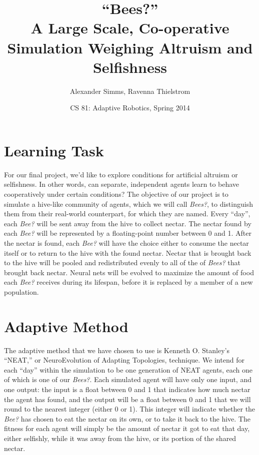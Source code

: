 \documentclass{article}
\title  {``Bees?''\\ A Large Scale, Co-operative Simulation Weighing Altruism and Selfishness}
\author {Alexander Simms, Ravenna Thielstrom}
\date   {CS 81: Adaptive Robotics, Spring 2014}
\begin{document}
\maketitle





\section{Learning Task} %
\label{sec:learning_task}

	For our final project, we'd like to explore conditions for artificial altruism or selfishness. In other words, can separate, independent agents learn to behave cooperatively under certain conditions? The objective of our project is to simulate a hive-like community of agents, which we will call \emph{Bees?}, to distinguish them from their real-world counterpart, for which they are named. Every ``day'', each \emph{Bee?} will be sent away from the hive to collect nectar. The nectar found by each \emph{Bee?} will be represented by a floating-point number between 0 and 1. After the nectar is found, each \emph{Bee?} will have the choice either to consume the nectar itself or to return to the hive with the found nectar. Nectar that is brought back to the hive will be pooled and redistributed evenly to all of the of \emph{Bees?} that brought back nectar. Neural nets will be evolved to maximize the amount of food each \emph{Bee?} receives during its lifespan, before it is replaced by a member of a new population.
		



\section{Adaptive Method} %
\label{sec:adaptive_method}

	The adaptive method that we have chosen to use is Kenneth O. Stanley's ``NEAT,'' or NeuroEvolution of Adapting Topologies, technique. We intend for each ``day'' within the simulation to be one generation of NEAT agents, each one of which is one of our \emph{Bees?}. Each simulated agent will have only one input, and one output: the input is a float between 0 and 1 that indicates how much nectar the agent has found, and the output will be a float between 0 and 1 that we will round to the nearest integer (either 0 or 1). This integer will indicate whether the \emph{Bee?} has chosen to eat the nectar on its own, or to take it back to the hive. The fitness for each agent will simply be the amount of nectar it got to eat that day, either selfishly, while it was away from the hive, or its portion of the shared nectar. 
	
\end{document}

